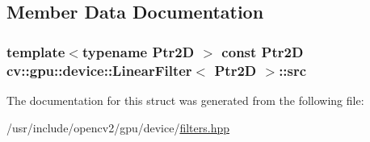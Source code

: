 \subsection{Member Data Documentation}
\hypertarget{structcv_1_1gpu_1_1device_1_1LinearFilter_a536017f297d84521d07d9c2677b3dcc5}{
\subsubsection[{src}]{\setlength{\rightskip}{0pt plus 5cm}template$<$typename Ptr2\-D $>$ const Ptr2\-D {\bf cv\-::gpu\-::device\-::\-Linear\-Filter}$<$ Ptr2\-D $>$\-::src}}\label{structcv_1_1gpu_1_1device_1_1LinearFilter_a536017f297d84521d07d9c2677b3dcc5}


The documentation for this struct was generated from the following file\-:\begin{DoxyCompactItemize}
\item 
/usr/include/opencv2/gpu/device/\hyperlink{filters_8hpp}{filters.\-hpp}\end{DoxyCompactItemize}
